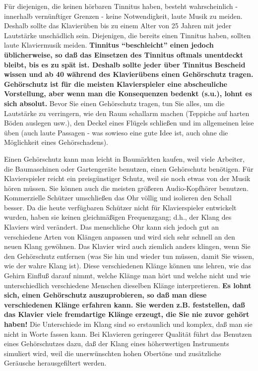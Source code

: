 Für diejenigen, die keinen hörbaren Tinnitus haben, besteht wahrscheinlich - innerhalb vernünftiger Grenzen - keine Notwendigkeit, laute Musik zu meiden.
Deshalb sollte das Klavierüben bis zu einem Alter von 25 Jahren mit jeder Lautstärke unschädlich sein.
Diejenigen, die bereits einen Tinnitus haben, sollten laute Klaviermusik meiden.
\textbf{Tinnitus \enquote{beschleicht} einen jedoch üblicherweise, so daß das Einsetzen des Tinnitus oftmals unentdeckt bleibt, bis es zu spät ist.
Deshalb sollte jeder über Tinnitus Bescheid wissen und ab 40 während des Klavierübens einen Gehörschutz tragen.
Gehörschutz ist für die meisten Klavierspieler eine abscheuliche Vorstellung, aber wenn man die Konsequenzen bedenkt (s.u.), lohnt es sich absolut.}
Bevor Sie einen Gehörschutz tragen, tun Sie alles, um die Lautstärke zu verringern, wie den Raum schallarm machen (Teppiche auf harten Böden auslegen usw.), den Deckel eines Flügels schließen und im allgemeinen leise üben (auch laute Passagen - was sowieso eine gute Idee ist, auch ohne die Möglichkeit eines Gehörschadens).

Einen Gehörschutz kann man leicht in Baumärkten kaufen, weil viele Arbeiter, die Baumaschinen oder Gartengeräte benutzen, einen Gehörschutz benötigen.
Für Klavierspieler reicht ein preisgünstiger Schutz, weil sie noch etwas von der Musik hören müssen.
Sie können auch die meisten größeren Audio-Kopfhörer benutzen.
Kommerzielle Schützer umschließen das Ohr völlig und isolieren den Schall besser.
Da die heute verfügbaren Schützer nicht für Klavierspieler entwickelt wurden, haben sie keinen gleichmäßigen Frequenzgang; d.h., der Klang des Klaviers wird verändert.
Das menschliche Ohr kann sich jedoch gut an verschiedene Arten von Klängen anpassen und wird sich sehr schnell an den neuen Klang gewöhnen.
Das Klavier wird auch ziemlich anders klingen, wenn Sie den Gehörschutz entfernen (was Sie hin und wieder tun müssen, damit Sie wissen, wie der wahre Klang ist).
Diese verschiedenen Klänge können uns lehren, wie das Gehirn Einfluß darauf nimmt, welche Klänge man hört und welche nicht und wie unterschiedlich verschiedene Menschen dieselben Klänge interpretieren.
\textbf{Es lohnt sich, einen Gehörschutz auszuprobieren, so daß man diese verschiedenen Klänge erfahren kann.
Sie werden z.B. feststellen, daß das Klavier viele fremdartige Klänge erzeugt, die Sie nie zuvor gehört haben!}
Die Unterschiede im Klang sind so erstaunlich und komplex, daß man sie nicht in Worte fassen kann.
Bei Klavieren geringerer Qualität führt das Benutzen eines Gehörschutzes dazu, daß der Klang eines höherwertigen Instruments simuliert wird, weil die unerwünschten hohen Obertöne und zusätzliche Geräusche herausgefiltert werden.

